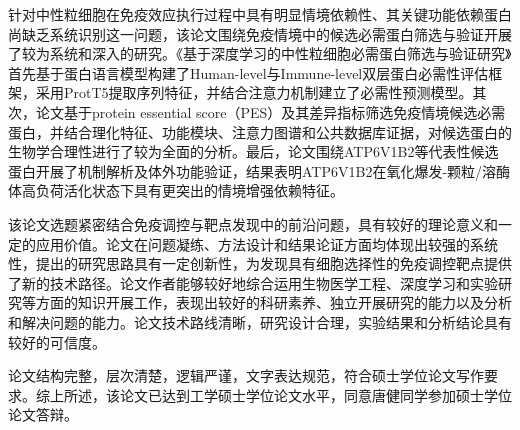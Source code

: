 
\begin{comments}

  针对中性粒细胞在免疫效应执行过程中具有明显情境依赖性、其关键功能依赖蛋白尚缺乏系统识别这一问题，该论文围绕免疫情境中的候选必需蛋白筛选与验证开展了较为系统和深入的研究。《基于深度学习的中性粒细胞必需蛋白筛选与验证研究》首先基于蛋白语言模型构建了Human-level与Immune-level双层蛋白必需性评估框架，采用ProtT5提取序列特征，并结合注意力机制建立了必需性预测模型。其次，论文基于protein essential score（PES）及其差异指标筛选免疫情境候选必需蛋白，并结合理化特征、功能模块、注意力图谱和公共数据库证据，对候选蛋白的生物学合理性进行了较为全面的分析。最后，论文围绕ATP6V1B2等代表性候选蛋白开展了机制解析及体外功能验证，结果表明ATP6V1B2在氧化爆发-颗粒/溶酶体高负荷活化状态下具有更突出的情境增强依赖特征。

  该论文选题紧密结合免疫调控与靶点发现中的前沿问题，具有较好的理论意义和一定的应用价值。论文在问题凝练、方法设计和结果论证方面均体现出较强的系统性，提出的研究思路具有一定创新性，为发现具有细胞选择性的免疫调控靶点提供了新的技术路径。论文作者能够较好地综合运用生物医学工程、深度学习和实验研究等方面的知识开展工作，表现出较好的科研素养、独立开展研究的能力以及分析和解决问题的能力。论文技术路线清晰，研究设计合理，实验结果和分析结论具有较好的可信度。

  论文结构完整，层次清楚，逻辑严谨，文字表达规范，符合硕士学位论文写作要求。综上所述，该论文已达到工学硕士学位论文水平，同意唐健同学参加硕士学位论文答辩。

\end{comments}
